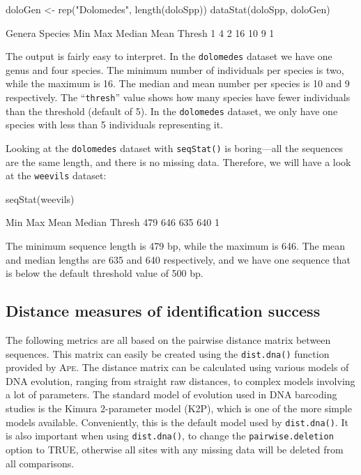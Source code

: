 \documentclass{article}
\newcommand{\progname}[1]{\textsc{#1}}
\newcommand{\fun}[1]{\texttt{#1}}
\begin{document}
\begin{console}
doloGen <- rep("Dolomedes", length(doloSpp))
dataStat(doloSpp, doloGen)
\end{console}

\begin{Routput}
 Genera Species     Min     Max  Median    Mean  Thresh 
      1       4       2      16      10       9       1 
\end{Routput}

The output is fairly easy to interpret. In the \fun{dolomedes} dataset we have one genus and four species. The minimum number of individuals per species is two, while the maximum is 16. The median and mean number per species is 10 and 9 respectively. The ``\fun{thresh}'' value shows how many species have fewer individuals than the threshold (default of 5). In the \fun{dolomedes} dataset, we only have one species with less than 5 individuals representing it.

Looking at the \fun{dolomedes} dataset with \fun{seqStat()} is boring---all the sequences are the same length, and there is no missing data. Therefore, we will have a look at the \fun{weevils} dataset:

\begin{console}
seqStat(weevils)
\end{console}

\begin{Routput}
   Min    Max   Mean Median Thresh 
   479    646    635    640      1
\end{Routput}

The minimum sequence length is 479 bp, while the maximum is 646. The mean and median lengths are 635 and 640 respectively, and we have one sequence that is below the default threshold value of 500 bp.


\subsection{Distance measures of identification success}

The following metrics are all based on the pairwise distance matrix between sequences. This matrix can easily be created using the \fun{dist.dna()} function provided by \progname{Ape}. The distance matrix can be calculated using various models of DNA evolution, ranging from straight raw distances, to complex models involving a lot of parameters. The standard model of evolution used in DNA barcoding studies is the Kimura 2-parameter model (K2P), which is one of the more simple models available. Conveniently, this is the default model used by \fun{dist.dna()}. It is also important when using \fun{dist.dna()}, to change the  \fun{pairwise.deletion} option to TRUE, otherwise all sites with any missing data will be deleted from all comparisons.
\end{document}
